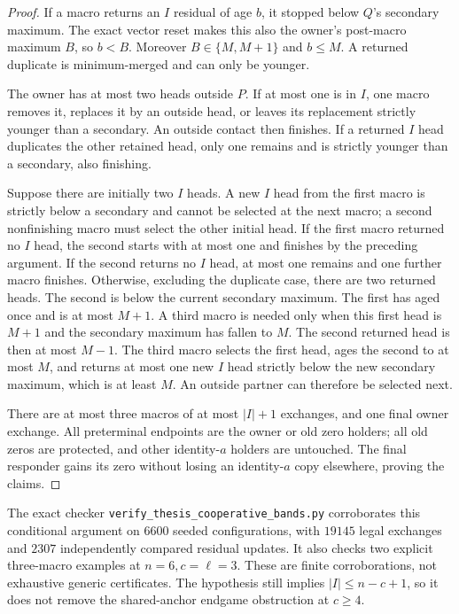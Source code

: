 \documentclass[11pt]{article}
\begin{document}
\begin{proof}
If a macro returns an $I$ residual of age $b$, it stopped
below $Q$'s secondary maximum. The exact vector reset makes
this also the owner's post-macro maximum $B$, so $b<B$.
Moreover $B\in\{M,M+1\}$ and $b\le M$. A returned
duplicate is minimum-merged and can only be younger.

The owner has at most two heads outside $P$. If at most one
is in $I$, one macro removes it, replaces it by an outside
head, or leaves its replacement strictly younger than a
secondary. An outside contact then finishes. If a returned
$I$ head duplicates the other retained head, only one remains
and is strictly younger than a secondary, also finishing.

Suppose there are initially two $I$ heads. A new $I$ head
from the first macro is strictly below a secondary and
cannot be selected at the next macro; a second nonfinishing
macro must select the other initial head. If the first
macro returned no $I$ head, the second starts with at most
one and finishes by the preceding argument. If the second
returns no $I$ head, at most one remains and one further
macro finishes. Otherwise, excluding the duplicate case,
there are two returned heads. The second is below the
current secondary maximum. The first has aged once and is
at most $M+1$. A third macro is needed only when this first
head is $M+1$ and the secondary maximum has fallen to $M$.
The second returned head is then at most $M-1$. The third
macro selects the first head, ages the second to at most
$M$, and returns at most one new $I$ head strictly below
the new secondary maximum, which is at least $M$.
An outside partner can therefore be selected next.

There are at most three macros of at most $|I|+1$ exchanges,
and one final owner exchange. All preterminal endpoints
are the owner or old zero holders; all old zeros are
protected, and other identity-$a$ holders are untouched.
The final responder gains its zero without losing an
identity-$a$ copy elsewhere, proving the claims.
\end{proof}

The exact checker \texttt{verify\_thesis\_cooperative\_bands.py}
corroborates this conditional argument on $6600$ seeded
configurations, with $19145$ legal exchanges and $2307$
independently compared residual updates. It also checks two
explicit three-macro examples at $n=6,c=\ell=3$. These are
finite corroborations, not exhaustive generic certificates.
The hypothesis still implies $|I|\le n-c+1$, so it does not
remove the shared-anchor endgame obstruction at $c\ge4$.
\end{document}
